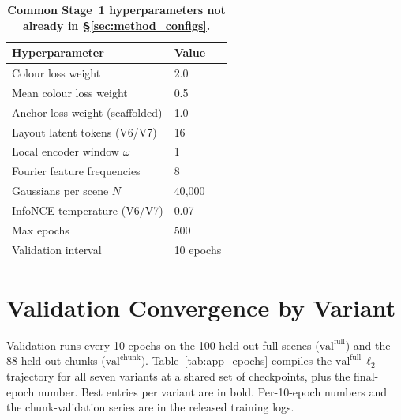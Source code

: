 \begin{table}[h]
  \centering
  \caption[Common Stage~1 hyperparameters]{\textbf{Common Stage~1 hyperparameters not already in \S\ref{sec:method_configs}.}}
  \label{tab:app_hp}
  {\small
  \begin{tabular}{ll}
    \toprule
    Hyperparameter                  & Value \\
    \midrule
    Colour loss weight              & 2.0 \\
    Mean colour loss weight         & 0.5 \\
    Anchor loss weight (scaffolded) & 1.0 \\
    Layout latent tokens (V6/V7)    & 16 \\
    Local encoder window $\omega$   & 1 \\
    Fourier feature frequencies     & 8 \\
    Gaussians per scene $N$         & 40{,}000 \\
    InfoNCE temperature (V6/V7)     & 0.07 \\
    Max epochs                      & 500 \\
    Validation interval             & 10 epochs \\
    \bottomrule
  \end{tabular}}
\end{table}

\section{Validation Convergence by Variant}
\label{app:epoch_tables}

Validation runs every 10 epochs on the 100 held-out full scenes ($\text{val}^{\text{full}}$) and the 88 held-out chunks ($\text{val}^{\text{chunk}}$). Table~\ref{tab:app_epochs} compiles the $\text{val}^{\text{full}}\,\ell_2$ trajectory for all seven variants at a shared set of checkpoints, plus the final-epoch number. Best entries per variant are in bold. Per-10-epoch numbers and the chunk-validation series are in the released training logs.


